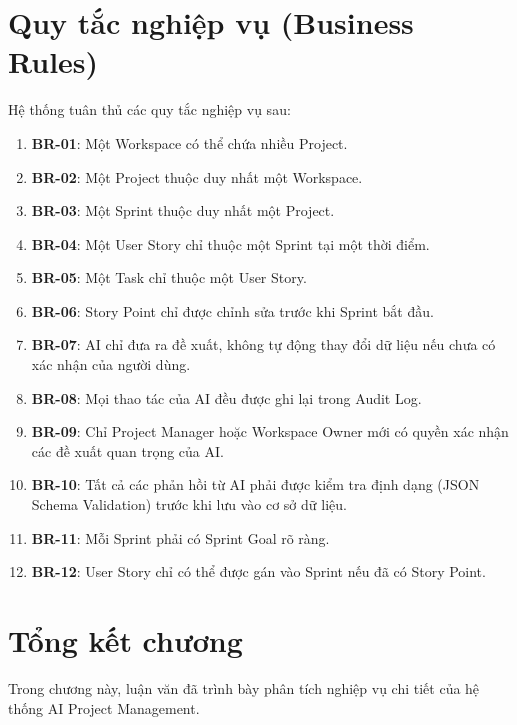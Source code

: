 \documentclass[12pt,a4paper]{report}
\begin{document}
\section{Quy tắc nghiệp vụ (Business Rules)}

Hệ thống tuân thủ các quy tắc nghiệp vụ sau:

\begin{enumerate}
\item \textbf{BR-01}: Một Workspace có thể chứa nhiều Project.
\item \textbf{BR-02}: Một Project thuộc duy nhất một Workspace.
\item \textbf{BR-03}: Một Sprint thuộc duy nhất một Project.
\item \textbf{BR-04}: Một User Story chỉ thuộc một Sprint tại một thời điểm.
\item \textbf{BR-05}: Một Task chỉ thuộc một User Story.
\item \textbf{BR-06}: Story Point chỉ được chỉnh sửa trước khi Sprint bắt đầu.
\item \textbf{BR-07}: AI chỉ đưa ra đề xuất, không tự động thay đổi dữ liệu nếu chưa có xác nhận của người dùng.
\item \textbf{BR-08}: Mọi thao tác của AI đều được ghi lại trong Audit Log.
\item \textbf{BR-09}: Chỉ Project Manager hoặc Workspace Owner mới có quyền xác nhận các đề xuất quan trọng của AI.
\item \textbf{BR-10}: Tất cả các phản hồi từ AI phải được kiểm tra định dạng (JSON Schema Validation) trước khi lưu vào cơ sở dữ liệu.
\item \textbf{BR-11}: Mỗi Sprint phải có Sprint Goal rõ ràng.
\item \textbf{BR-12}: User Story chỉ có thể được gán vào Sprint nếu đã có Story Point.
\end{enumerate}

\section{Tổng kết chương}


Trong chương này, luận văn đã trình bày phân tích nghiệp vụ chi tiết của hệ thống AI Project Management.
\end{document}
